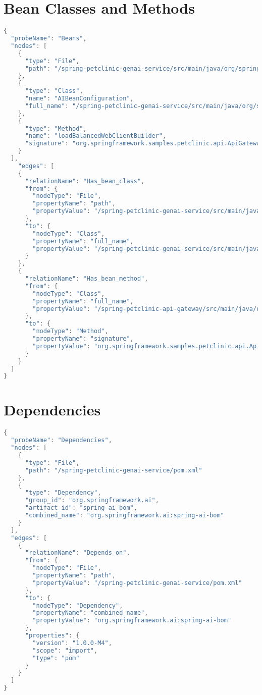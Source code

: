 \section{Bean Classes and Methods}\label{appendix_sec:bean_classes_methods}
\begin{lstlisting}[language=java]
{
  "probeName": "Beans",
  "nodes": [
    {
      "type": "File",
      "path": "/spring-petclinic-genai-service/src/main/java/org/springframework/samples/petclinic/genai/AIBeanConfiguration.java"
    },
    {
      "type": "Class",
      "name": "AIBeanConfiguration",
      "full_name": "/spring-petclinic-genai-service/src/main/java/org/springframework/samples/petclinic/genai/AIBeanConfiguration.java:AIBeanConfiguration"
    },
    {
      "type": "Method",
      "name": "loadBalancedWebClientBuilder",
      "signature": "org.springframework.samples.petclinic.api.ApiGatewayApplication.loadBalancedWebClientBuilder()"
    }
  ],
    "edges": [
    {
      "relationName": "Has_bean_class",
      "from": {
        "nodeType": "File",
        "propertyName": "path",
        "propertyValue": "/spring-petclinic-genai-service/src/main/java/org/springframework/samples/petclinic/genai/AIBeanConfiguration.java"
      },
      "to": {
        "nodeType": "Class",
        "propertyName": "full_name",
        "propertyValue": "/spring-petclinic-genai-service/src/main/java/org/springframework/samples/petclinic/genai/AIBeanConfiguration.java:AIBeanConfiguration"
      }
    },
    {
      "relationName": "Has_bean_method",
      "from": {
        "nodeType": "Class",
        "propertyName": "full_name",
        "propertyValue": "/spring-petclinic-api-gateway/src/main/java/org/springframework/samples/petclinic/api/ApiGatewayApplication.java:ApiGatewayApplication"
      },
      "to": {
        "nodeType": "Method",
        "propertyName": "signature",
        "propertyValue": "org.springframework.samples.petclinic.api.ApiGatewayApplication.loadBalancedWebClientBuilder()"
      }
    }
  ]
}
\end{lstlisting}

\section{Dependencies}\label{appendix_sec:dependencies}
\begin{lstlisting}[language=java]
{
  "probeName": "Dependencies",
  "nodes": [
    {
      "type": "File",
      "path": "/spring-petclinic-genai-service/pom.xml"
    },
    {
      "type": "Dependency",
      "group_id": "org.springframework.ai",
      "artifact_id": "spring-ai-bom",
      "combined_name": "org.springframework.ai:spring-ai-bom"
    }
  ],
  "edges": [
    {
      "relationName": "Depends_on",
      "from": {
        "nodeType": "File",
        "propertyName": "path",
        "propertyValue": "/spring-petclinic-genai-service/pom.xml"
      },
      "to": {
        "nodeType": "Dependency",
        "propertyName": "combined_name",
        "propertyValue": "org.springframework.ai:spring-ai-bom"
      },
      "properties": {
        "version": "1.0.0-M4",
        "scope": "import",
        "type": "pom"
      }
    }
  ]
}
\end{lstlisting}